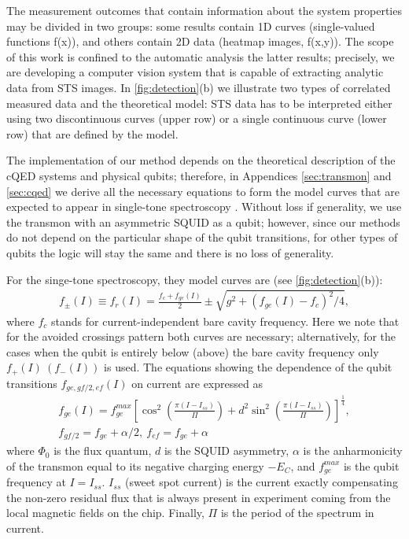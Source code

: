 \documentclass[%
 aip,
 draft,
 amsmath,amssymb,
 reprint,%
]{revtex4-1}
\begin{document}
The measurement outcomes that contain information about the system properties may be divided in two groups: some results contain 1D curves (single-valued functions f(x)), and others contain 2D data (heatmap images, f(x,y)). The scope of this work is confined to the automatic analysis the latter results; precisely, we are developing a computer vision system that is capable of extracting analytic data from STS images. In \autoref{fig:detection}(b) we illustrate two types of correlated measured data and the theoretical model: STS data has to be interpreted either using two discontinuous curves (upper row) or a single continuous curve (lower row) that are defined by the model. 

The implementation of our method depends on the theoretical description of the cQED systems and physical qubits; therefore, in Appendices \ref{sec:transmon} and \ref{sec:cqed} we derive all the necessary equations to form the model curves that are expected to appear in single-tone spectroscopy . Without loss if generality, we use the transmon\cite{koch2007} with an asymmetric SQUID as a qubit; however, since our methods do not depend on the particular shape of the qubit transitions, for other types of qubits the logic will stay the same and there is no loss of generality.

For the singe-tone spectroscopy, they model curves are (see \autoref{fig:detection}(b)):
\begin{align}
f_\pm(I) \equiv f_r(I) = \frac{f_c + f_{ge}(I)}{2} \pm \sqrt{g^2+(f_{ge}(I) - f_c)^2/4},\label{eq:f_r}
\end{align}
where $f_c$ stands for current-independent bare cavity frequency. Here we note that for the avoided crossings pattern both curves are necessary; alternatively, for the cases when the qubit is entirely below (above) the bare cavity frequency only $ f_+(I)\ \left(f_-(I)\right)$ is used. The equations showing the dependence of the qubit transitions $f_{ge, gf/2, ef}(I)$ on current are expressed as
\begin{equation}
\begin{gathered}
f_{ge}(I) = f_{ge}^{max} \left[\cos^2\left(\frac{\pi(I-I_{ss})}{\Pi}\right)+d^2 \sin^2 \left(\frac{\pi(I-I_{ss})}{\Pi}\right)\right]^\frac{1}{4}, \\
f_{gf/2} = f_{ge} + \alpha/2,\ f_{ef}=f_{ge} + \alpha
\end{gathered}\label{eq:tr_spectrum}
\end{equation}
where $\Phi_0$ is the flux quantum, $d$ is the SQUID asymmetry, $\alpha$ is the anharmonicity of the transmon equal to its negative charging energy $-E_C$, and $f_{ge}^{max}$ is the qubit frequency at $I = I_{ss}$. $I_{ss}$ (sweet spot current) is the current exactly compensating the non-zero residual flux that is always present in experiment coming from the local magnetic fields on the chip. Finally, $\Pi$ is the period of the spectrum in current.
\end{document}
